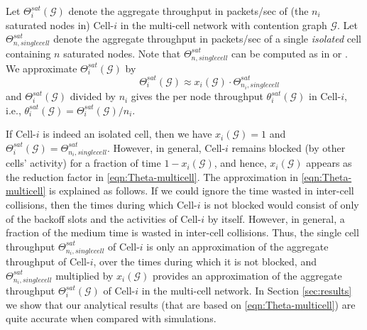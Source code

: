\documentclass[10pt,a4paper,journal]{IEEEtran}
\theoremstyle{definition}
\theoremstyle{remark}
\theoremstyle{plain}
\begin{document}
Let $\Theta_i^{sat}(\mathcal{G})$ denote the aggregate throughput in packets/sec of (the $n_i$ saturated nodes in) Cell-$i$ in the multi-cell network with contention graph $\mathcal{G}$. Let $\Theta_{n,singlecell}^{sat}$ denote the aggregate throughput in packets/sec of a single \textit{isolated} cell containing $n$ saturated nodes. Note that $\Theta_{n,singlecell}^{sat}$ can be computed as in \cite{wanet.bianchi00performance} or \cite{wanet.kumar_etal07new_insights}. We approximate $\Theta_i^{sat}(\mathcal{G})$ by 
\begin{equation}
\label{eqn:Theta-multicell}
\quad \quad \quad \quad \quad \Theta_{i}^{sat}(\mathcal{G}) \approx x_i(\mathcal{G}) \cdot \Theta_{n_i,singlecell}^{sat}
\end{equation} 
and $\Theta_i^{sat}(\mathcal{G})$ divided by $n_i$ gives the per node throughput $\theta_i^{sat}(\mathcal{G})$ in Cell-$i$, i.e., $\theta_i^{sat}(\mathcal{G}) = \Theta_i^{sat}(\mathcal{G})/n_i$. 




If Cell-$i$ is indeed an isolated cell, then we have $x_i(\mathcal{G}) = 1$ and $\Theta_i^{sat}(\mathcal{G}) = \Theta_{n_i,singlecell}^{sat}$. However, in general, Cell-$i$ remains blocked (by other cells' activity) for a fraction of time $1-x_i(\mathcal{G})$, and hence, $x_i(\mathcal{G})$ appears as the reduction factor in \eqref{eqn:Theta-multicell}. The approximation in \eqref{eqn:Theta-multicell} is explained as follows. If we could ignore the time wasted in inter-cell collisions, then the times during which Cell-$i$ is not blocked would consist of only of the backoff slots and the activities of Cell-$i$ by itself. However, in general, a fraction of the medium time is wasted in inter-cell collisions. Thus, the single cell throughput $\Theta_{n_i,singlecell}^{sat}$ of Cell-$i$ is only an approximation of the aggregate throughput of Cell-$i$, over the times during which it is not blocked, and $\Theta_{n_i,singlecell}^{sat}$ multiplied by $x_i(\mathcal{G})$ provides an approximation of the aggregate throughput $\Theta_i^{sat}(\mathcal{G})$ of Cell-$i$ in the multi-cell network. In Section \ref{sec:results} we show that our analytical results (that are based on \eqref{eqn:Theta-multicell}) are quite accurate when compared with simulations. 
\end{document}
